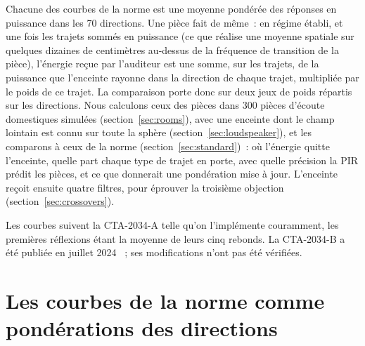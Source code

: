 \documentclass[11pt,a4paper]{article}
\begin{document}
Chacune des courbes de la norme est une moyenne pondérée des réponses en puissance dans les 70
directions. Une pièce fait de même~: en régime établi, et une fois les trajets sommés en puissance (ce
que réalise une moyenne spatiale sur quelques dizaines de centimètres au-dessus de la fréquence de
transition de la pièce), l'énergie reçue par l'auditeur est une somme, sur les trajets, de la puissance
que l'enceinte rayonne dans la direction de chaque trajet, multipliée par le poids de ce trajet. La
comparaison porte donc sur deux jeux de poids répartis sur les directions. Nous calculons ceux des
pièces dans 300 pièces d'écoute domestiques simulées (section~\ref{sec:rooms}), avec une enceinte dont le
champ lointain est connu sur toute la sphère (section~\ref{sec:loudspeaker}), et les comparons à ceux de
la norme (section~\ref{sec:standard})~: où l'énergie quitte l'enceinte, quelle part chaque type de trajet
en porte, avec quelle précision la PIR prédit les pièces, et ce que donnerait une pondération mise à
jour. L'enceinte reçoit ensuite quatre filtres, pour éprouver la troisième objection
(section~\ref{sec:crossovers}).

Les courbes suivent la CTA-2034-A telle qu'on l'implémente couramment, les premières réflexions étant
la moyenne de leurs cinq rebonds. La CTA-2034-B a été publiée en juillet 2024 \cite{cta2034b}~; ses
modifications n'ont pas été vérifiées.

\section{Les courbes de la norme comme pondérations des directions}
\label{sec:cta}
\end{document}

